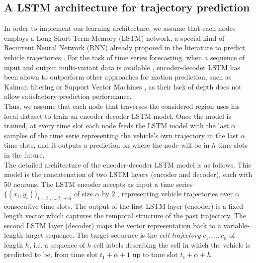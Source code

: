 \documentclass[conference]{IEEEtran}
\begin{document}
\subsection{A LSTM architecture for trajectory prediction}
In order to implement our learning architecture, we assume that each nodes employs a Long Short Term Memory (LSTM) network, a special kind of Recurrent Neural Network (RNN) already proposed in the literature to predict vehicle trajectories \cite{altche2017lstm}. For the task of time series forecasting, when a sequence of input and output multi-variant data is available \cite{kim2017probabilistic}\cite{ondruvska2016deep}, encoder-decoder LSTM has been shown to outperform other approaches for motion prediction, such as Kalman filtering \cite{carvalho2014stochastic} or Support Vector Machines \cite{kumar2013learning}, as their lack of depth does not allow satisfactory prediction performance.\\
Thus, we assume that each node that traverses the considered region uses his local dataset to train an encoder-decoder LSTM model. Once the model is trained, at every time slot each node feeds the LSTM model with the last $\alpha$ samples of the time serie representing the vehicle's own trajectory in the last $\alpha$ time slots, and it outputs a prediction on where the node will be in $h$ time slots in the future.\\
The detailed architecture of the encoder-decoder LSTM model is as follows. This model is the concatenation of two LSTM layers (encoder and decoder), each with 50 neurons. The LSTM encoder accepts as input a time series $\{( x_t,y_t)\}_{t=t_1,...,t_1+\alpha}$ of size $\alpha$ by $2$%
, representing vehicle trajectories over $\alpha$ consecutive time slots. 
The output of the first LSTM layer (encoder) is a fixed-length vector which captures the temporal structure of the past trajectory. The second LSTM layer (decoder)  maps the vector representation back to a variable-length target sequence. The target sequence is the \textit{cell trajectory} 
$c_1,..., c_h$ of length $h$, i.e. a sequence of $h$ cell labels describing the cell in which the vehicle is predicted to be, from time slot $t_1+\alpha+1$ up to time slot $t_1+\alpha+h$.  
\end{document}
